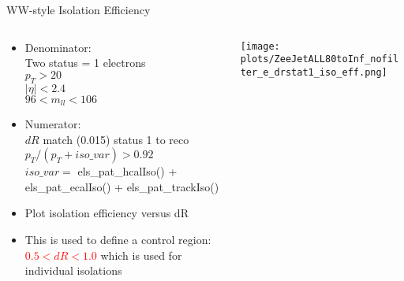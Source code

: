 \documentclass{beamer}
\begin{document}
\begin{frame}{WW-style Isolation Efficiency}
  \begin{columns}
    \begin{column}{0.5\textwidth}
      \small{
      \begin{itemize}
      \item Denominator:\\ Two status = 1 electrons \\ $p_T > 20$\\ $|\eta| < 2.4$\\ $96 < m_{ll} < 106$
      \item Numerator:\\ $dR$ match (0.015) status 1 to reco\\ $p_T/(p_T + iso\_var) > 0.92$\\ \footnotesize{ $iso\_var =$ els\_pat\_hcalIso() + els\_pat\_ecalIso() + els\_pat\_trackIso()}
      \item Plot isolation efficiency versus dR
      \item This is used to define a control region: \textcolor{red}{$0.5 < dR < 1.0$} which is used for individual isolations
      \end{itemize}
      }
    \end{column}

    \begin{column}{0.55\textwidth}

      \texttt{[image: plots/ZeeJetALL80toInf\_nofilter\_e\_drstat1\_iso\_eff.png]}
    \end{column}        

  \end{columns}
\end{frame}
\end{document}
